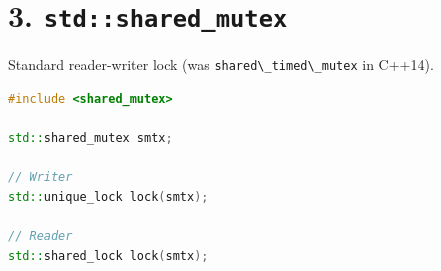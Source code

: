 \hypertarget{stdshared_mutex}{%
\section{\texorpdfstring{3.
\texttt{std::shared\_mutex}}{3. std::shared\_mutex}}\label{stdshared_mutex}}

Standard reader-writer lock (was
\passthrough{\lstinline!shared\_timed\_mutex!} in C++14).

\begin{lstlisting}[language={C++}]
#include <shared_mutex>

std::shared_mutex smtx;

// Writer
std::unique_lock lock(smtx);

// Reader
std::shared_lock lock(smtx);
\end{lstlisting}

